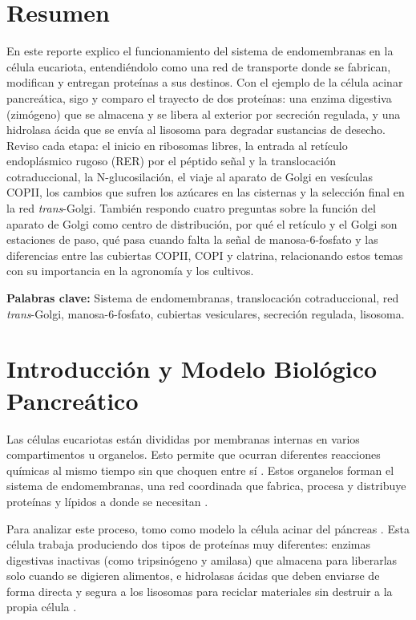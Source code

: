 \documentclass[spanish,letterpaper,oneside]{article}
\begin{document}
\hypersetup{pageanchor=false}
\templatePortrait
\clearpage
\hypersetup{pageanchor=true}
\templatePagecfg
\singlespacing
\setlength{\tabcolsep}{6pt}
\renewcommand{\arraystretch}{1.18}

\section*{Resumen}
En este reporte explico el funcionamiento del sistema de endomembranas en la célula eucariota, entendiéndolo como una red de transporte donde se fabrican, modifican y entregan proteínas a sus destinos. Con el ejemplo de la célula acinar pancreática, sigo y comparo el trayecto de dos proteínas: una enzima digestiva (zimógeno) que se almacena y se libera al exterior por secreción regulada, y una hidrolasa ácida que se envía al lisosoma para degradar sustancias de desecho. Reviso cada etapa: el inicio en ribosomas libres, la entrada al retículo endoplásmico rugoso (RER) por el péptido señal y la translocación cotraduccional, la N-glucosilación, el viaje al aparato de Golgi en vesículas COPII, los cambios que sufren los azúcares en las cisternas y la selección final en la red \textit{trans}-Golgi. También respondo cuatro preguntas sobre la función del aparato de Golgi como centro de distribución, por qué el retículo y el Golgi son estaciones de paso, qué pasa cuando falta la señal de manosa-6-fosfato y las diferencias entre las cubiertas COPII, COPI y clatrina, relacionando estos temas con su importancia en la agronomía y los cultivos.

\vspace{0.2cm}
\noindent\textbf{Palabras clave:} Sistema de endomembranas, translocación cotraduccional, red \textit{trans}-Golgi, manosa-6-fosfato, cubiertas vesiculares, secreción regulada, lisosoma.

\section{Introducción y Modelo Biológico Pancreático}
Las células eucariotas están divididas por membranas internas en varios compartimentos u organelos. Esto permite que ocurran diferentes reacciones químicas al mismo tiempo sin que choquen entre sí \parencite{alberts2022molecular}. Estos organelos forman el sistema de endomembranas, una red coordinada que fabrica, procesa y distribuye proteínas y lípidos a donde se necesitan \parencite{lodish2021molecular, fortoul2020histologia}.

Para analizar este proceso, tomo como modelo la célula acinar del páncreas \parencite{kierszenbaum2020histologia}. Esta célula trabaja produciendo dos tipos de proteínas muy diferentes: enzimas digestivas inactivas (como tripsinógeno y amilasa) que almacena para liberarlas solo cuando se digieren alimentos, e hidrolasas ácidas que deben enviarse de forma directa y segura a los lisosomas para reciclar materiales sin destruir a la propia célula \parencite{karp2019biologia, lieberman2018marks}.
\end{document}
